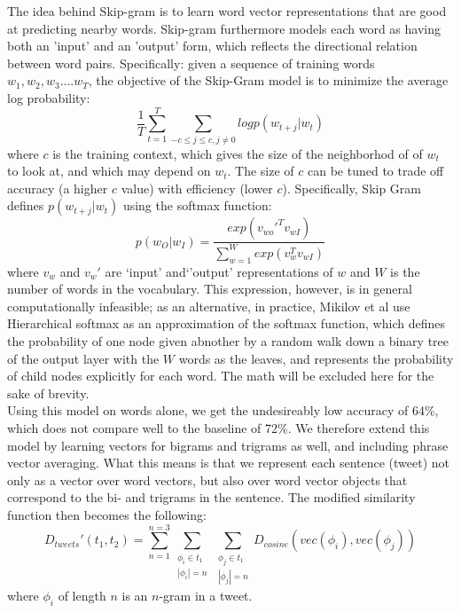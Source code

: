 \documentclass[conference]{IEEEtran}
\begin{document}
\indent The idea behind Skip-gram is to learn word vector representations that are good at predicting nearby words.  Skip-gram furthermore models each word as having both an 'input' and an 'output' form, which reflects the directional relation between word pairs.  Specifically: given a sequence of training words $w_1, w_2, w_3 .... w_T$, the objective of the Skip-Gram model is to minimize the average log probability:
\begin{equation}
\frac{1}{T} \sum_{t=1}^T \sum_{-c \leq j \leq c, j \neq 0} logp(w_{t+j}|w_t)
\end{equation}
where $c$ is the training context, which gives the size of the neighborhod of of $w_t$ to look at, and which may depend on $w_t$. The size of $c$ can be tuned to trade off accuracy (a higher $c$ value) with efficiency (lower $c$). Specifically, Skip Gram defines $p(w_{t+j}|w_t)$ using the softmax function:
\begin{equation}
p(w_O|w_I) = \frac{exp(v_{wo}'^Tv_{wI})}{\sum_{w=1}^W exp(v_w^Tv_{wI})}
\end{equation}
where $v_w$ and $v_w'$ are `input' and`'output' representations of $w$ and $W$ is the number of words in the vocabulary.  This expression, however, is in general computationally infeasible; as an alternative, in practice, Mikilov et al use Hierarchical softmax as an approximation of the softmax function, which defines the probability of one node given abnother by a random walk down a binary tree of the output layer with the  $W$ words as the leaves, and represents the probability of child nodes explicitly for each word.  The math will be excluded here for the sake of brevity. \\

\indent Using this model on words alone, we get the undesireably low accuracy of 64\%, which does not compare well to the baseline of 72\%.  We therefore extend this model by learning vectors for bigrams and trigrams as well, and including phrase vector averaging.  What this means is that we represent each sentence (tweet) not only as a vector over word vectors, but also over word vector objects that correspond to the bi- and trigrams in the sentence.  The modified similarity function then becomes the following:
\begin{equation}
D_{tweets}'(t_1, t_2) = \sum_{n=1}^{n=3} \sum_{
\substack{\phi_i \in t_1 \\  |\phi_i| = n}} 
\sum_{\substack{\phi_j \in t_1 \\  |\phi_j| = n}} 
D_{cosine}(vec(\phi_i), vec(\phi_j))
\end{equation}
where $\phi_i$ of length $n$ is an $n$-gram in a tweet.\\
\end{document}
